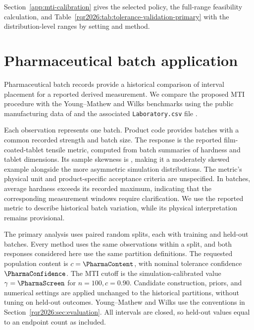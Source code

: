 Section~\ref{app:mti-calibration} gives the selected policy, the full-range
feasibility calculation, and Table~\ref{rqr2026:tab:tolerance-validation-primary}
with the distribution-level ranges by setting and method.

\section{Pharmaceutical batch application}
\label{rqr2026:sec:pharma-application}



Pharmaceutical batch records provide a historical comparison of interval
placement for a reported derived measurement. We compare the proposed MTI procedure with
the Young--Mathew and Wilks benchmarks using the public manufacturing data of
\citet{rqr-ZagarMihelic2022PharmaManufacturing} and the associated
\texttt{Laboratory.csv} file \citep{rqr-ZagarMihelic2021LaboratoryCsv}.

Each observation represents one batch. Product code \PharmaProductCode{}
provides \PharmaBatches{} batches with a common recorded strength and batch
size. The response is the reported film-coated-tablet tensile metric,
computed from batch summaries of hardness and tablet dimensions.
Its sample skewness is \PharmaTensileSkewness{}, making it a
moderately skewed example alongside the more asymmetric simulation
distributions. The metric's physical unit and product-specific acceptance
criteria are unspecified. In
\PharmaFctHardnessQuestions{} batches, average hardness exceeds its recorded
maximum, indicating that the corresponding measurement windows require
clarification. We use the reported metric to describe historical batch
variation, while its physical interpretation remains provisional.

The primary analysis uses \PharmaSplits{} paired random splits, each with
\PharmaTrain{} training and \PharmaHeldout{} held-out batches. Every method
uses the same observations within a split, and both responses considered here
use the same partition definitions. The requested population content is
\(c=\PharmaContent\), with nominal tolerance confidence
\(\PharmaConfidence\). The MTI cutoff is the simulation-calibrated value
\(\gamma=\PharmaScreen\) for \(n=100,c=0.90\). Candidate construction,
priors, and numerical settings are applied unchanged to the historical
partitions, without tuning on held-out outcomes. Young--Mathew and Wilks use the conventions in
Section~\ref{rqr2026:sec:evaluation}. All intervals are closed, so held-out values
equal to an endpoint count as included.

